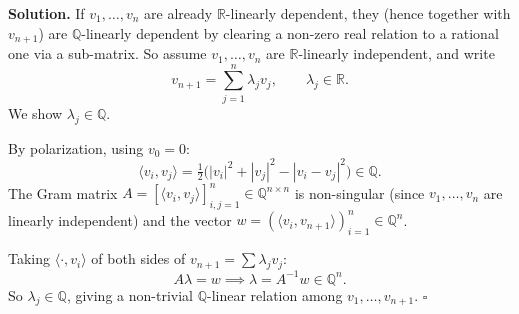 \documentclass{article}
\newcommand{\R}{\mathbb{R}}
\newcommand{\Q}{\mathbb{Q}}
\begin{document}
\textbf{Solution.}
If \( v_1, \ldots, v_n \) are already \( \R \)-linearly dependent, they (hence together with \( v_{n+1} \)) are \( \Q \)-linearly dependent by clearing a non-zero real relation to a rational one via a sub-matrix. So assume \( v_1, \ldots, v_n \) are \( \R \)-linearly independent, and write
\[
v_{n+1} = \sum_{j=1}^n \lambda_j v_j, \qquad \lambda_j \in \R.
\]
We show \( \lambda_j \in \Q \).

By polarization, using \( v_0 = 0 \):
\[
\langle v_i, v_j \rangle = \tfrac{1}{2}\bigl( |v_i|^2 + |v_j|^2 - |v_i - v_j|^2 \bigr) \in \Q.
\]
The Gram matrix \( A = [\langle v_i, v_j \rangle]_{i,j=1}^n \in \Q^{n \times n} \) is non-singular (since \( v_1, \ldots, v_n \) are linearly independent) and the vector \( w = (\langle v_i, v_{n+1} \rangle)_{i=1}^n \in \Q^n \).

Taking \( \langle \cdot, v_i \rangle \) of both sides of \( v_{n+1} = \sum \lambda_j v_j \):
\[
A \lambda = w \implies \lambda = A^{-1} w \in \Q^n.
\]
So \( \lambda_j \in \Q \), giving a non-trivial \( \Q \)-linear relation among \( v_1, \ldots, v_{n+1} \). \hfill\(\square\)
\end{document}
